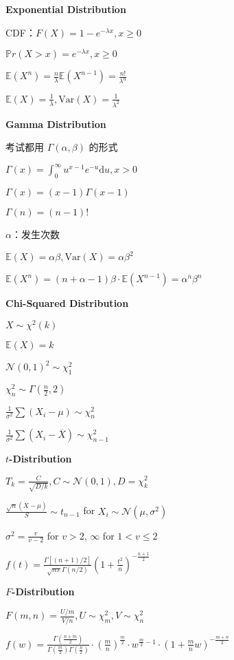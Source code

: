 \documentclass[9pt,landscape]{article}
\begin{document}
\begin{multicols}{3}
\textbf{Exponential Distribution}

CDF：$F(X)=1-e^{-\lambda x}, x\ge 0$

$\mathbb{P}r(X>x)=e^{-\lambda x}, x\ge 0$

$\mathbb{E}(X^n)=\frac{n}{\lambda}\mathbb{E}(X^{n-1})=\frac{n!}{\lambda^n}$

$\mathbb{E}(X)=\frac{1}{\lambda}, \mathrm{Var}(X)=\frac{1}{\lambda^2}$

\textbf{Gamma Distribution}

考试都用 $\Gamma(\alpha, \beta)$ 的形式

$\Gamma(x)=\int_{0}^{\infty}u^{x-1}e^{-u}\mathrm{d}u, x>0$

$\Gamma(x)=(x-1)\Gamma(x - 1)$

$\Gamma(n)=(n-1)!$

$\alpha$：发生次数

$\mathbb{E}(X)=\alpha\beta, \mathrm{Var}(X)=\alpha\beta^2$

$\mathbb{E}(X^n)=(n+\alpha-1)\beta\cdot\mathbb{E}(X^{n-1})=\alpha^{\overline{n}}\beta^n$

\textbf{Chi-Squared Distribution}

$X\sim \chi^2(k)$

$\mathbb{E}(X)=k$

$\mathcal{N}(0, 1)^2\sim \chi^2_1$

$\chi^2_n\sim \Gamma\left(\frac{n}{2}, 2\right)$

$\frac{1}{\sigma^2}\sum (X_i-\mu)\sim\chi^2_n$

$\frac{1}{\sigma^2}\sum (X_i-\overline{X})\sim\chi^2_{n-1}$

\textbf{$t$-Distribution}

$T_k = \frac{C}{\sqrt{D/k}}, C\sim\mathcal{N}(0, 1), D = \chi^2_k$

$\frac{\sqrt{n}(\overline{X}-\mu)}{S}\sim t_{n-1}$ for $X_i\sim \mathcal{N}(\mu, \sigma^2)$

$\sigma^2=\frac{v}{v-2}$ for $v>2$, $\infty$ for $1<v\le 2$

$f(t)=\frac{\Gamma[(n + 1) / 2]}{\sqrt{n\pi}\Gamma(n/2)}\left(1 + \frac{t^2}{n}\right)^{-\frac{n + 1}{2}}$

\textbf{$F$-Distribution}

$F(m, n) = \frac{U/m}{V/n}, U\sim\chi_m^2, V\sim \chi_n^2$

$f(w)=\frac{\Gamma\left(\frac{n+m}{2}\right)}{\Gamma\left(\frac{m}{2}\right)\Gamma\left(\frac{n}{2}\right)}\cdot\left(\frac{m}{n}\right)^{\frac{m}{2}}\cdot w^{\frac{m}{2}-1}\cdot\left(1+\frac{m}{n}w\right)^{-\frac{m+n}{2}}$


\end{multicols}
\end{document}
